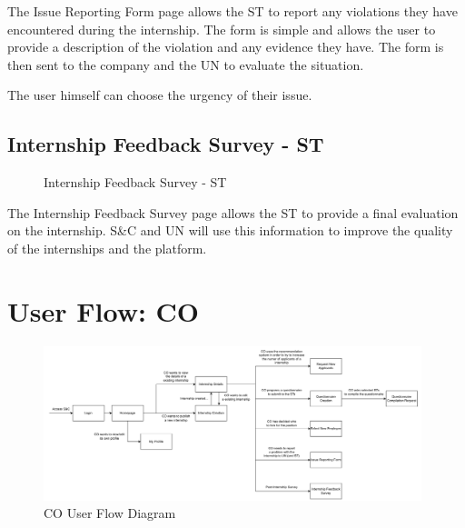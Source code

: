 \par The Issue Reporting Form page allows the ST to report any violations they have encountered during the
internship. The form is simple and allows the user to provide a description of the violation and any evidence they
have. The form is then sent to the company and the UN to evaluate the situation.

\par The user himself can choose the urgency of their issue.

\subsection{Internship Feedback Survey - ST}
\label{subsec:internship-feedback-survey-st}%

\begin{figure}[H]
    \centering
    \caption{Internship Feedback Survey - ST}
    \label{fig:internship-feedback-survey-st}
\end{figure}

\par The Internship Feedback Survey page allows the ST to provide a final evaluation on the internship. S\&C and UN
will use this information to improve the quality of the internships and the platform.

\section{User Flow: CO}
\label{sec:user-flow-co}%

\begin{figure}[H]
    \centering
    \includegraphics[width=0.98\textwidth]{Images/GUI/CO/Diagram.pdf}
    \caption{CO User Flow Diagram}
    \label{fig:co-user-flow-diagram}
\end{figure}

